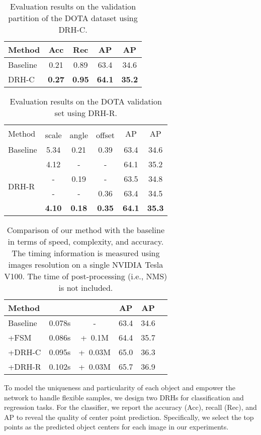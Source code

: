 \documentclass[10pt,twocolumn,letterpaper]{article}
\begin{document}
\begin{table}\centering
{
\begin{tabular}{lcccc}
	\toprule
     Method &Acc &Rec & AP &AP \\ \hline
	 Baseline &0.21 &0.89 & 63.4 & 34.6 \\
     DRH-C & \textbf{0.27}  & \textbf{0.95} & \textbf{64.1} & \textbf{35.2}\\
	\bottomrule
\end{tabular}
}
\caption{Evaluation results on the validation partition of the DOTA dataset using DRH-C.}
\label{tab:drmc}
\end{table}
 \begin{table}\centering
\begin{tabular}{lccccc}
	\toprule
     \multirow{2}{*}{Method} &\multicolumn{3}{c}{} &\multirow{2}{*}{AP} &\multirow{2}{*}{AP} \\  
     &scale & angle & offset & \\ \hline
	 Baseline & 5.34 & 0.21 & 0.39 &63.4 &34.6 \\ \hline
	 \multirow{4}{*}{DRH-R}
       &4.12 & - &- &64.1 &35.2 \\ 
       & - & 0.19 &- &63.5 &34.8 \\ 
       & - & - &0.36 &63.4 &34.5 \\ 
       & \textbf{4.10} & \textbf{0.18} & \textbf{0.35} &\textbf{64.1} &\textbf{35.3} \\
	\bottomrule
\end{tabular}
\caption{Evaluation results on the DOTA validation set using DRH-R.}
\label{tab:drmr}
\end{table}
 \begin{table}\centering
\begin{tabular}{lccccc}
    \toprule
      Method  & &  & AP & AP  \\ \hline
      Baseline &0.078s & - & 63.4 & 34.6 \\ \hline
      +FSM &0.086s &+~0.1M & 64.4 & 35.7 \\ 
      +DRH-C &0.095s &+~0.03M  & 65.0 & 36.3\\
      +DRH-R &0.102s &+~0.03M & 65.7 &36.9 \\
     \bottomrule
\end{tabular}
\caption{Comparison of our method with the baseline in terms of speed, complexity, and accuracy. The timing information is measured using images resolution  on a single NVIDIA Tesla V100. The time of post-processing (i.e., NMS) is not included.}
\label{tab:sz_sp}
\end{table}
 To model the uniqueness and particularity of each object and empower the network to handle flexible samples, we design two DRHs for classification and regression tasks.
For the classifier, we report the accuracy (Acc), recall (Rec), and AP to reveal the quality of center point prediction.
Specifically, we select the top  points as the predicted object centers for each image in our experiments.
\end{document}
